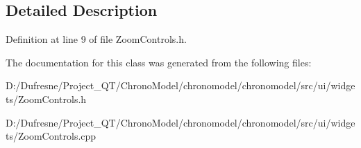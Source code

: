 \subsection{Detailed Description}


Definition at line 9 of file Zoom\-Controls.\-h.



The documentation for this class was generated from the following files\-:\begin{DoxyCompactItemize}
\item 
D\-:/\-Dufresne/\-Project\-\_\-\-Q\-T/\-Chrono\-Model/chronomodel/chronomodel/src/ui/widgets/Zoom\-Controls.\-h\item 
D\-:/\-Dufresne/\-Project\-\_\-\-Q\-T/\-Chrono\-Model/chronomodel/chronomodel/src/ui/widgets/Zoom\-Controls.\-cpp\end{DoxyCompactItemize}
